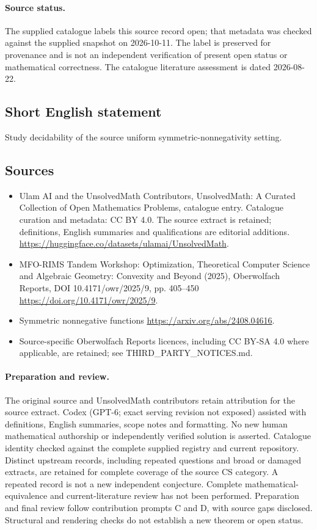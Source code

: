 \documentclass[11pt]{article}
\begin{document}
\paragraph{Source status.}
The supplied catalogue labels this source record open; that metadata was checked against the supplied snapshot on 2026-10-11. The label is preserved for provenance and is not an independent verification of present open status or mathematical correctness. The catalogue literature assessment is dated 2026-08-22.
\subsection{Short English statement}
Study decidability of the source uniform symmetric-nonnegativity setting.
\subsection{Sources}
\begin{itemize}
\item[S1] Ulam AI and the UnsolvedMath Contributors, UnsolvedMath: A Curated Collection of Open Mathematics Problems, catalogue entry. Catalogue curation and metadata: CC BY 4.0. The source extract is retained; definitions, English summaries and qualifications are editorial additions.
\url{https://huggingface.co/datasets/ulamai/UnsolvedMath}.
\item[S2] MFO-RIMS Tandem Workshop: Optimization, Theoretical Computer Science and Algebraic Geometry: Convexity and Beyond (2025), Oberwolfach Reports, DOI 10.4171/owr/2025/9, pp. 405--450
\url{https://doi.org/10.4171/owr/2025/9}.
\item[S3] Symmetric nonnegative functions
\url{https://arxiv.org/abs/2408.04616}.
\item Source-specific Oberwolfach Reports licences, including CC BY-SA 4.0 where applicable, are retained; see THIRD\_PARTY\_NOTICES.md.
\end{itemize}
\paragraph{Preparation and review.}
The original source and UnsolvedMath contributors retain attribution for the source extract. Codex (GPT-6; exact serving revision not exposed) assisted with definitions, English summaries, scope notes and formatting. No new human mathematical authorship or independently verified solution is asserted. Catalogue identity checked against the complete supplied registry and current repository. Distinct upstream records, including repeated questions and broad or damaged extracts, are retained for complete coverage of the source CS category. A repeated record is not a new independent conjecture. Complete mathematical-equivalence and current-literature review has not been performed. Preparation and final review follow contribution prompts C and D, with source gaps disclosed. Structural and rendering checks do not establish a new theorem or open status.
\label{end:statement}
\end{document}
